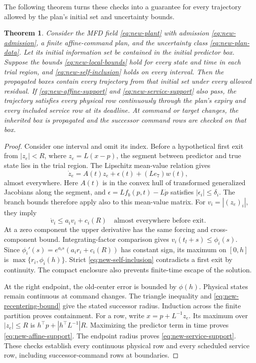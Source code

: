 \documentclass[preprint,12pt]{elsarticle}
\newtheorem{theorem}{Theorem}
\begin{document}
The following theorem turns these checks into a guarantee for every
trajectory allowed by the plan's initial set and uncertainty bounds.

\begin{theorem}
\label{thm:new-plan-enclosure}
Consider the MFD field \eqref{eq:new-plant} with admission
\eqref{eq:new-admission}, a finite affine-command plan, and the uncertainty
class \eqref{eq:new-plan-data}. Let its initial information set be contained
in the initial predictor box. Suppose the bounds
\eqref{eq:new-local-bounds} hold for every state and time in each trial
region, and
\eqref{eq:new-self-inclusion} holds on every interval. Then the propagated
boxes contain every trajectory from that initial set under every allowed
residual. If \eqref{eq:new-affine-support} and
\eqref{eq:new-service-support} also pass, the trajectory satisfies every
physical row continuously through the plan's expiry and every included
service row at its deadline. At command or target changes, the inherited box
is propagated and the successor command rows are checked on that box.
\end{theorem}

\begin{proof}
Consider one interval and omit its index. Before a hypothetical first exit
from $|z_e|<R$, where $z_e=L(x-p)$, the segment between predictor and true
state lies in the trial region. The Lipschitz mean-value relation gives
\begin{equation}
 \dot z_e=A(t)z_e+\epsilon(t)+(Le_7)w(t),
 \label{eq:new-error-dynamics}
\end{equation}
almost everywhere. Here $A(t)$ is in the convex hull of transformed
generalized Jacobians along the segment, and
$\epsilon=Lf_b(p,t)-L\dot p$ satisfies $|\epsilon_i|\le\delta_i$.
The branch bounds therefore apply also to this mean-value matrix.
For $v_i=|(z_e)_i|$, they imply
\begin{equation}
 \dot v_i\le a_iv_i+c_i(R)
 \quad\text{almost everywhere before exit}.
 \label{eq:new-error-comparison-proof}
\end{equation}
At a zero component the upper derivative has the same forcing and
cross-component bound. Integrating-factor comparison gives
$v_i(t_l+s)\le\phi_i(s)$. Since
$\phi_i'(s)=e^{a_is}(a_ir_i+c_i(R))$ has constant sign, its maximum on
$[0,h]$ is $\max\{r_i,\phi_i(h)\}$. Strict
\eqref{eq:new-self-inclusion} contradicts a first exit by continuity.
The compact enclosure also prevents finite-time escape of the solution.

At the right endpoint, the old-center error is bounded by $\phi(h)$.
Physical states remain continuous at command changes. The triangle
inequality and \eqref{eq:new-recentering-bound} give the stated successor
radius. Induction across the finite partition proves containment.
For a row, write $x=p+L^{-1}z_e$. Its maximum over $|z_e|\le R$ is
$h^\top p+|h^\top L^{-1}|R$. Maximizing the predictor term in time proves
\eqref{eq:new-affine-support}. The endpoint radius proves
\eqref{eq:new-service-support}. These checks establish every continuous
physical row and every scheduled service row, including successor-command
rows at boundaries.
\end{proof}
\end{document}
